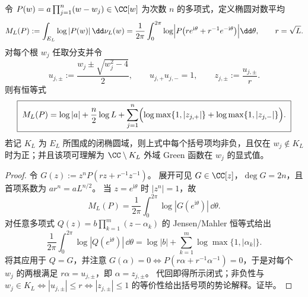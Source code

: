 \begin{theorem}\label{thm:xi-joukowsky-ellipse-mahler-green}
令 \(P(w)=a\prod_{j=1}^{n}(w-w_j)\in\CC[w]\) 为次数 \(n\) 的多项式，定义椭圆对数平均
\[
M_L(P):=\int_{E_L}\log|P(w)|\,\dd\nu_L(w)
=\frac{1}{2\pi}\int_{0}^{2\pi}\log\Bigl|P\!\left(r e^{\mathrm{i}\theta}+r^{-1}e^{-\mathrm{i}\theta}\right)\Bigr|\dd\theta,
\qquad r=\sqrt{L}.
\]
对每个根 \(w_j\) 任取分支并令
\[
u_{j,\pm}:=\frac{w_j\pm\sqrt{w_j^2-4}}{2},
\qquad
u_{j,+}u_{j,-}=1,
\qquad
z_{j,\pm}:=\frac{u_{j,\pm}}{r}.
\]
则有恒等式
\[
\boxed{\;
M_L(P)=\log|a|+\frac{n}{2}\log L+\sum_{j=1}^{n}\Bigl(\log\max\{1,|z_{j,+}|\}+\log\max\{1,|z_{j,-}|\}\Bigr).\;}
\]
若记 \(K_L\) 为 \(E_L\) 所围成的闭椭圆域，则上式中每个括号项均非负，且仅在 \(w_j\notin K_L\) 时为正；并且该项可理解为 \(\CC\setminus K_L\) 外域 Green 函数在 \(w_j\) 的显式值。
\end{theorem}
\begin{proof}
令 \(G(z):=z^{n}P(r z+r^{-1}z^{-1})\)。
展开可见 \(G\in\CC[z]\)，\(\deg G=2n\)，且首项系数为 \(a r^{n}=a L^{n/2}\)。
当 \(z=e^{\mathrm{i}\theta}\) 时 \(|z^{n}|=1\)，故
\[
M_L(P)=\frac{1}{2\pi}\int_{0}^{2\pi}\log|G(e^{\mathrm{i}\theta})|\,\dd\theta.
\]
对任意多项式 \(Q(z)=b\prod_{k=1}^{m}(z-\alpha_k)\) 的 Jensen/Mahler 恒等式给出
\[
\frac{1}{2\pi}\int_{0}^{2\pi}\log|Q(e^{\mathrm{i}\theta})|\,\dd\theta
=\log|b|+\sum_{k=1}^{m}\log\max\{1,|\alpha_k|\}.
\]
将其应用于 \(Q=G\)，并注意 \(G(\alpha)=0\iff P(r\alpha+r^{-1}\alpha^{-1})=0\)，于是对每个 \(w_j\) 的两根满足
\(
r\alpha=u_{j,\pm}
\)，即 \(\alpha=z_{j,\pm}\)。
代回即得所示闭式；非负性与 \(w_j\in K_L\iff |u_{j,\pm}|\le r\iff |z_{j,\pm}|\le 1\) 的等价性给出括号项的势论解释。证毕。
\end{proof}

